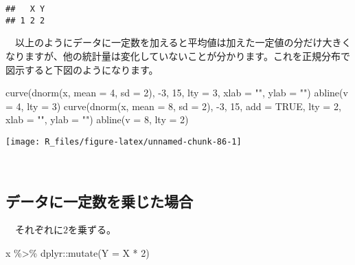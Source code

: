 \documentclass[
  12pt,
]{book}
\newenvironment{Shaded}{\begin{snugshade}}{\end{snugshade}}
\newcommand{\AttributeTok}[1]{\textcolor[rgb]{0.77,0.63,0.00}{#1}}
\newcommand{\ConstantTok}[1]{\textcolor[rgb]{0.00,0.00,0.00}{#1}}
\newcommand{\DecValTok}[1]{\textcolor[rgb]{0.00,0.00,0.81}{#1}}
\newcommand{\FunctionTok}[1]{\textcolor[rgb]{0.00,0.00,0.00}{#1}}
\newcommand{\NormalTok}[1]{#1}
\newcommand{\SpecialCharTok}[1]{\textcolor[rgb]{0.00,0.00,0.00}{#1}}
\newcommand{\StringTok}[1]{\textcolor[rgb]{0.31,0.60,0.02}{#1}}
\begin{document}
\begin{verbatim}
##   X Y
## 1 2 2
\end{verbatim}

　以上のようにデータに一定数を加えると平均値は加えた一定値の分だけ大きくなりますが、他の統計量は変化していないことが分かります。これを正規分布で図示すると下図のようになります。

\begin{Shaded}
\begin{Highlighting}[]
\FunctionTok{curve}\NormalTok{(}\FunctionTok{dnorm}\NormalTok{(x, }\AttributeTok{mean =} \DecValTok{4}\NormalTok{, }\AttributeTok{sd =} \DecValTok{2}\NormalTok{), }\SpecialCharTok{{-}}\DecValTok{3}\NormalTok{, }\DecValTok{15}\NormalTok{, }\AttributeTok{lty =} \DecValTok{3}\NormalTok{, }\AttributeTok{xlab =} \StringTok{""}\NormalTok{, }\AttributeTok{ylab =} \StringTok{""}\NormalTok{)}
\FunctionTok{abline}\NormalTok{(}\AttributeTok{v =} \DecValTok{4}\NormalTok{, }\AttributeTok{lty =} \DecValTok{3}\NormalTok{)}
\FunctionTok{curve}\NormalTok{(}\FunctionTok{dnorm}\NormalTok{(x, }\AttributeTok{mean =} \DecValTok{8}\NormalTok{, }\AttributeTok{sd =} \DecValTok{2}\NormalTok{), }\SpecialCharTok{{-}}\DecValTok{3}\NormalTok{, }\DecValTok{15}\NormalTok{, }\AttributeTok{add =} \ConstantTok{TRUE}\NormalTok{, }\AttributeTok{lty =} \DecValTok{2}\NormalTok{, }\AttributeTok{xlab =} \StringTok{""}\NormalTok{, }\AttributeTok{ylab =} \StringTok{""}\NormalTok{)}
\FunctionTok{abline}\NormalTok{(}\AttributeTok{v =} \DecValTok{8}\NormalTok{, }\AttributeTok{lty =} \DecValTok{2}\NormalTok{)}
\end{Highlighting}
\end{Shaded}

\begin{center}\texttt{[image: R\_files/figure-latex/unnamed-chunk-86-1]} \end{center}

　

\hypertarget{ux30c7ux30fcux30bfux306bux4e00ux5b9aux6570ux3092ux4e57ux3058ux305fux5834ux5408}{%
\subsection*{データに一定数を乗じた場合}\label{ux30c7ux30fcux30bfux306bux4e00ux5b9aux6570ux3092ux4e57ux3058ux305fux5834ux5408}}

　それぞれに\(2\)を乗ずる。

\begin{Shaded}
\begin{Highlighting}[]
\NormalTok{x }\SpecialCharTok{\%\textgreater{}\%} 
\NormalTok{  dplyr}\SpecialCharTok{::}\FunctionTok{mutate}\NormalTok{(}\AttributeTok{Y =}\NormalTok{ X }\SpecialCharTok{*} \DecValTok{2}\NormalTok{)}
\end{Highlighting}
\end{Shaded}
\end{document}
